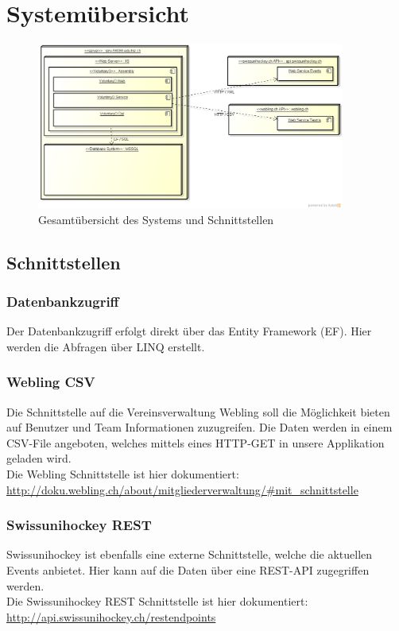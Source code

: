 \chapter{Systemübersicht}
    \begin{figure}[h]
  		\vspace{-5pt}
    	\centering
    	\includegraphics[width=0.9\textwidth]{content/architekturdokumentation/images/uebersicht_der_komponenten.png}
  		\vspace{-25pt}
    	\caption{Gesamtübersicht des Systems und Schnittstellen}
	\end{figure}
	\vspace{-25pt}
	\section{Schnittstellen}
		\subsection{Datenbankzugriff}
		Der Datenbankzugriff erfolgt direkt über das Entity Framework (EF). Hier werden die Abfragen über LINQ erstellt.

		\subsection{Webling CSV}
		Die Schnittstelle auf die Vereinsverwaltung Webling soll die Möglichkeit bieten auf Benutzer und Team Informationen zuzugreifen. Die Daten werden in einem CSV-File angeboten, welches mittels eines HTTP-GET in unsere Applikation geladen wird.
		\\Die Webling Schnittstelle ist hier dokumentiert: 
		\\\url{http://doku.webling.ch/about/mitgliederverwaltung/#mit_schnittstelle}

		\subsection{Swissunihockey REST}
		Swissunihockey ist ebenfalls eine externe Schnittstelle, welche die aktuellen Events anbietet. Hier kann auf die Daten über eine REST-API zugegriffen werden.
		\\Die Swissunihockey REST Schnittstelle ist hier dokumentiert: 
		\\\url{http://api.swissunihockey.ch/restendpoints}

